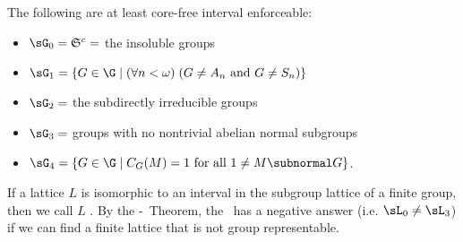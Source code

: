 \begin{frame}[label=IEProps]{}
The following are at least core-free interval enforceable:
\vskip5mm
\begin{itemize}
\item $\sG_0 = \mathfrak{S}^c = $ the insoluble groups
\vskip2mm
\item $\sG_1 =\{G\in \G \mid (\forall n<\omega) \; (G \neq A_n \text{ and }  G\neq S_n) \}$
\vskip2mm
\item $\sG_2 = $ the subdirectly irreducible groups
\vskip2mm
\item $\sG_3 = $ groups with no nontrivial abelian normal subgroups
\vskip2mm
\item $\sG_4 = \{G\in \G \mid C_G(M) = 1 \text{ for all } 1\neq M\subnormal G\}$.
\end{itemize}
\vskip5mm
\end{frame}

\begin{frame}[label=IEProps]{}
\vskip2mm
If a lattice $L$ is isomorphic to an interval in the subgroup lattice of a finite group, then we call
$L$ .  
\vskip5mm
By the \Palfy-\Pudlak\ Theorem, the
\FLRP\ has a negative answer (i.e. $\sL_0 \neq \sL_3$) if we can find a finite
lattice that is not group representable.  
\vskip5mm
\end{frame}

